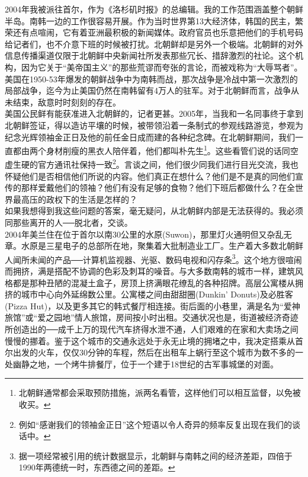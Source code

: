 2004年我被派往首尔，作为《洛杉矶时报》的总编辑。我的工作范围涵盖整个朝鲜半岛。南韩一边的工作很容易开展。作为当时世界第13大经济体，韩国的民主，繁荣还有点喧闹，它有着亚洲最积极的新闻媒体。政府官员也乐意把他们的手机号码给记者们，也不介意下班的时候被打扰。北朝鲜却是另外一个极端。北朝鲜的对外信息传播渠道仅限于北朝鲜中央新闻社所发表那些冗长、措辞激烈的社论。这个机构，因为它关于“美帝国主义”的那些荒谬而夸张的言论，而被戏称为“大辱骂者”。美国在1950-53年爆发的朝鲜战争中为南韩而战，那次战争是冷战中第一次激烈的局部战争，迄今为止美国仍然在南韩留有4万人的驻军。对于北朝鲜而言，战争从未结束，敌意时时刻刻的存在。\\

美国公民鲜有能获准进入北朝鲜的，记者更甚。2005年，当我和一名同事终于拿到北朝鲜签证，得以造访平壤的时候，被带领沿着一条制式的参观线路游览，参观为纪念光辉领袖金正日及他的前任金日成而建的各种纪念碑。在北朝鲜期间，我们一直都由两个身材削瘦的黑衣人陪伴着，他们都叫朴先生\footnote{北朝鲜通常都会采取预防措施，派两名看管，这样他们可以相互监督，以免被收买。}。这些看管们说的话同空虚生硬的官方通讯社保持一致\footnote{例如“感谢我们的领袖金正日”这个短语以令人奇异的频率反复出现在我们的谈话中。}。言谈之间，他们很少同我们进行目光交流，我也怀疑他们是否相信他们所说的内容。他们真正在想什么？他们是不是真的同他们宣传的那样爱戴他们的领袖？他们有没有足够的食物？他们下班后都做什么？在全世界最高压的政权下的生活是怎样的？\\

如果我想得到我这些问题的答案，毫无疑问，从北朝鲜内部是无法获得的。我必须同那些离开的人──脱北者，交谈。\\

2004年美兰住在位于首尔以南30公里的水原(Suwon)，那里灯火通明但又杂乱无章。水原是三星电子的总部所在地，聚集着大批制造业工厂。生产着大多数北朝鲜人闻所未闻的产品──计算机监视器、光驱、数码电视和闪存条\footnote{据一项经常被引用的统计数据显示，北朝鲜与南韩之间的经济差距，四倍于1990年两德统一时，东西德之间的差距。}。这个地方很喧闹而拥挤，满是搭配不协调的色彩及刺耳的噪音。与大多数南韩的城市一样，建筑风格都是那种丑陋的混凝土盒子，房顶上挤满眼花缭乱的各种招牌。高层公寓楼从拥挤的城市中心向外延绵数公里。公寓楼之间由甜甜圈(Dunkin{\EN '} Donuts)及必胜客(Pizza Hut)，以及更多其它的韩式餐厅相连接。街后面的小巷里，满是名为“爱神旅馆”或“爱之园地”情人旅馆，房间按小时出租。交通状况也是，街道被经济奇迹所创造出的──成千上万的现代汽车挤得水泄不通，人们艰难的在家和大卖场之间慢慢的挪着。鉴于这个城市的交通永远处于永无止境的拥堵之中，我决定搭乘从首尔出发的火车，仅仅30分钟的车程，然后在出租车上蜗行至这个城市为数不多的一处幽静之地，一个烤牛排餐厅，位于一个建于18世纪的古军事城堡的对面。\\


